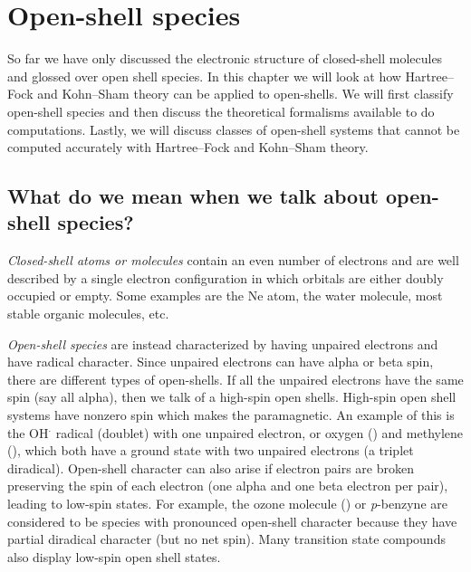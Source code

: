 \documentclass[../Main/chem371-notes.tex]{subfiles}
\begin{document}
\chapter{Open-shell species}



So far we have only discussed the electronic structure of closed-shell molecules and glossed over open shell species.
In this chapter we will look at how Hartree--Fock and Kohn--Sham theory can be applied to open-shells.
We will first classify open-shell species and then discuss the theoretical formalisms available to do computations.
Lastly, we will discuss classes of open-shell systems that cannot be computed accurately with Hartree--Fock and Kohn--Sham theory.

\section{What do we mean when we talk about open-shell species?}

\emph{Closed-shell atoms or molecules} contain an even number of electrons and are well described by a single electron configuration in which orbitals are either doubly occupied or empty.
Some examples are the Ne atom, the water molecule, most stable organic molecules, etc.

\emph{Open-shell species} are instead characterized by having unpaired electrons and have radical character.
Since unpaired electrons can have alpha or beta spin, there are different types of open-shells.
If all the unpaired electrons have the same spin (say all alpha), then we talk of a high-spin open shells.
High-spin open shell systems have nonzero spin which makes the paramagnetic.
An example of this is the OH$^\cdot$ radical (doublet) with one unpaired electron, or oxygen () and methylene (), which both have a ground state with two unpaired electrons (a triplet diradical).
Open-shell character can also arise if electron pairs are broken preserving the spin of each electron (one alpha and one beta electron per pair), leading to low-spin states.
For example, the ozone molecule () or \textit{p}-benzyne are considered to be species with pronounced open-shell character because they have partial diradical character (but no net spin).
Many transition state compounds also display low-spin open shell states.
\end{document}

